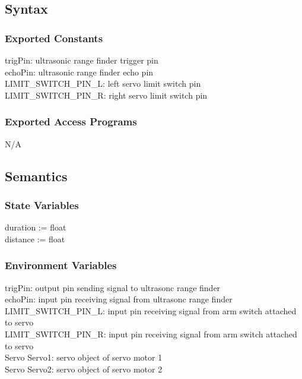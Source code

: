 \documentclass[12pt, titlepage]{article}
\begin{document}
\subsection{Syntax}
\subsubsection{Exported Constants}
trigPin: ultrasonic range finder trigger pin\\
echoPin: ultrasonic range finder echo pin\\
LIMIT\_SWITCH\_PIN\_L: left servo limit switch pin\\
LIMIT\_SWITCH\_PIN\_R: right servo limit switch pin\\
\subsubsection{Exported Access Programs}

N/A

\subsection{Semantics}

\subsubsection{State Variables}

duration := float\\
distance := float\\

\subsubsection{Environment Variables}

trigPin: output pin sending signal to ultrasonc range finder\\
echoPin: input pin receiving signal from ultrasonc range finder\\
LIMIT\_SWITCH\_PIN\_L: input pin receiving signal from arm switch attached to servo\\
LIMIT\_SWITCH\_PIN\_R: input pin receiving signal from arm switch attached to servo\\
Servo Servo1: servo object of servo motor 1\\
Servo Servo2: servo object of servo motor 2\\
\end{document}
